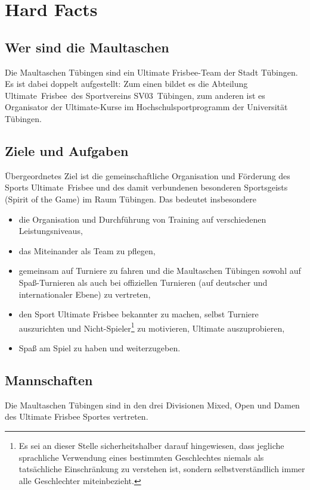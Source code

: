 \documentclass[a4 paper, 11pt]{article}
\begin{document}
\newpage

\tableofcontents

\newpage

\section{Hard Facts}

\subsection{Wer sind die Maultaschen}
Die Maultaschen Tübingen sind ein Ultimate Frisbee-Team der Stadt Tübingen. 
Es ist dabei doppelt aufgestellt:
Zum einen bildet es die Abteilung \glqq Ultimate~Frisbee\grqq\ des Sportvereins SV03~Tübingen, zum anderen ist es Organisator der Ultimate-Kurse im Hochschulsportprogramm der Universität Tübingen.

\subsection{Ziele und Aufgaben}
Übergeordnetes Ziel ist die gemeinschaftliche Organisation und Förderung des Sports Ultimate~Frisbee und des damit verbundenen besonderen Sportsgeists (\glqq Spirit of the Game\grqq) im Raum Tübingen.
Das bedeutet insbesondere
\begin{itemize}
\item die Organisation und Durchführung von Training auf verschiedenen Leistungsniveaus,
\item das Miteinander als Team zu pflegen,
\item gemeinsam auf Turniere zu fahren und die Maultaschen Tübingen sowohl auf Spaß-Turnieren als auch bei offiziellen Turnieren (auf deutscher und internationaler Ebene) zu vertreten,
\item den Sport Ultimate Frisbee bekannter zu machen, selbst Turniere auszurichten und Nicht-Spieler\footnote{Es sei an dieser Stelle sicherheitshalber darauf hingewiesen, dass jegliche sprachliche Verwendung eines bestimmten Geschlechtes niemals als tatsächliche Einschränkung zu verstehen ist, sondern selbstverständlich immer alle Geschlechter miteinbezieht.} zu motivieren, Ultimate auszuprobieren,
\item Spaß am Spiel zu haben und weiterzugeben.
\end{itemize}

\subsection{Mannschaften}
Die Maultaschen Tübingen sind in den drei Divisionen Mixed, Open und Damen des Ultimate Frisbee Sportes vertreten.
\end{document}
